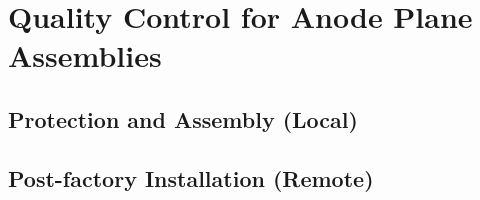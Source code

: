 \chapter{Quality Control for Anode Plane Assemblies}
\label{ch:fdsp-apa-qc}

\section{Protection and Assembly (Local)}
\label{sec:fdsp-apa-qc-local}


\section{Post-factory Installation (Remote)}
\label{sec:fdsp-apa-qc-remote}






